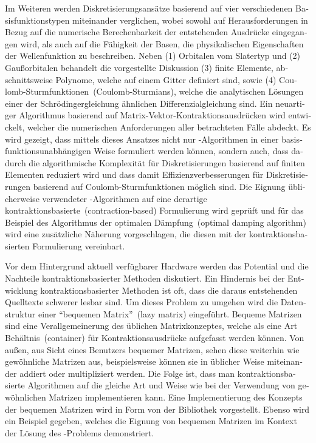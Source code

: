 \begin{otherlanguage}{ngerman}
Im Weiteren werden Diskretisierungsansätze basierend auf vier verschiedenen
Basisfunktionstypen miteinander verglichen,
wobei sowohl auf Herausforderungen in Bezug auf die numerische Berechenbarkeit
der entstehenden Ausdrücke
eingegangen wird,
als auch auf die Fähigkeit der Basen,
die physikalischen Eigenschaften der Wellenfunktion zu beschreiben.
Neben (1) Orbitalen vom Slatertyp und (2) Gaußorbitalen
behandelt die vorgestellte Diskussion
(3) finite Elemente,
abschnittsweise Polynome, welche auf einem Gitter definiert sind,
sowie (4) Coulomb-Sturmfunktionen~(Coulomb-Sturmians),
welche die analytischen Lösungen einer der Schrödingergleichung
ähnlichen Differenzialgleichung sind.
Ein neuartiger Algorithmus basierend auf Matrix-Vektor-Kontraktionsausdrücken
wird entwickelt,
welcher die numerischen Anforderungen aller betrachteten Fälle abdeckt.
Es wird gezeigt, dass mittels dieses Ansatzes
nicht nur \SCF-Algorithmen in einer basisfunktionsunabhängigen Weise
formuliert werden können, sondern auch,
dass dadurch die algorithmische Komplexität
für Diskretisierungen basierend auf finiten Elementen reduziert wird
und dass damit
Effizienzverbesserungen
für Diskretisierungen basierend auf Coulomb-Sturmfunktionen
möglich sind.
Die Eignung üblicherweise verwendeter \SCF-Algorithmen
auf eine derartige kontraktionsbasierte~(contraction-based)
Formulierung wird geprüft
und für das Beispiel des Algorithmus der optimalen Dämpfung~(optimal damping algorithm)
wird eine zusätzliche Näherung vorgeschlagen,
die diesen mit der kontraktionsbasierten Formulierung vereinbart.

Vor dem Hintergrund aktuell verfügbarer Hardware werden das Potential
und die Nachteile kontraktionsbasierter Methoden diskutiert.
Ein Hindernis bei der Entwicklung kontraktionsbasierter Methoden
ist oft, dass die daraus entstehenden Quelltexte schwerer lesbar sind.
Um dieses Problem zu umgehen wird die Datenstruktur
einer ``bequemen Matrix''~(lazy matrix) eingeführt.
Bequeme Matrizen sind eine Verallgemeinerung des üblichen Matrixkonzeptes,
welche als eine Art Behältnis~(container) für Kontraktionsausdrücke aufgefasst
werden können.
Von außen, aus Sicht eines Benutzers bequemer Matrizen,
sehen diese weiterhin wie gewöhnliche Matrizen aus,
beispielsweise können sie in üblicher Weise
miteinander addiert oder multipliziert werden.
Die Folge ist,
dass man kontraktionsbasierte Algorithmen auf die gleiche Art und Weise
wie bei der Verwendung von gewöhnlichen Matrizen implementieren kann.
Eine Implementierung des Konzepts der bequemen Matrizen
wird in Form von der Bibliothek \lazyten vorgestellt.
Ebenso wird ein Beispiel gegeben,
welches die Eignung von bequemen Matrizen im Kontext der
Lösung des \HF-Problems demonstriert.


\end{otherlanguage}
